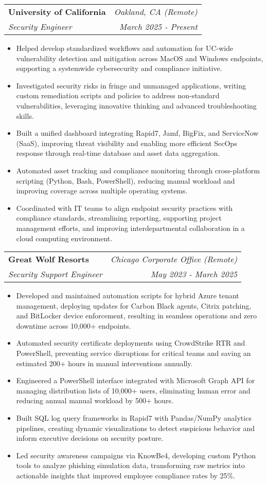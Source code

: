 \documentclass[letterpaper,10pt]{article}
\makeatletter
\newcommand{\resumeItem}[1]{
  \item\small{#1}
}
\newcommand{\resumeSubheading}[4]{
  \vspace{2pt}\item
    \begin{tabular*}{1.0\textwidth}[t]{l@{\extracolsep{\fill}}r}
      \textbf{#1} & \textit{#2} \\
      \textit{#3} & \textit{#4} \\
    \end{tabular*}\vspace{-4pt}
}
\newcommand{\resumeItemListStart}{\begin{itemize}[leftmargin=0.15in]}
\newcommand{\resumeItemListEnd}{\end{itemize}\vspace{-6pt}}
\makeatother
\begin{document}
    \resumeSubheading
      {University of California}{Oakland, CA (Remote)}
      {Security Engineer}{March 2025 - Present}
      \resumeItemListStart
        \resumeItem{Helped develop standardized workflows and automation for UC-wide vulnerability detection and mitigation across MacOS and Windows endpoints, supporting a systemwide cybersecurity and compliance initiative.}
        \resumeItem{Investigated security risks in fringe and unmanaged applications, writing custom remediation scripts and policies to address non-standard vulnerabilities, leveraging innovative thinking and advanced troubleshooting skills.}
        \resumeItem{Built a unified dashboard integrating Rapid7, Jamf, BigFix, and ServiceNow (SaaS), improving threat visibility and enabling more efficient SecOps response through real-time database and asset data aggregation.}
        \resumeItem{Automated asset tracking and compliance monitoring through cross-platform scripting (Python, Bash, PowerShell), reducing manual workload and improving coverage across multiple operating systems.}
        \resumeItem{Coordinated with IT teams to align endpoint security practices with compliance standards, streamlining reporting, supporting project management efforts, and improving interdepartmental collaboration in a cloud computing environment.}
      \resumeItemListEnd

    \resumeSubheading
      {Great Wolf Resorts}{Chicago Corporate Office (Remote)}
      {Security Support Engineer}{May 2023 - March 2025}
      \resumeItemListStart
        \resumeItem{Developed and maintained automation scripts for hybrid Azure tenant management, deploying updates for Carbon Black agents, Citrix patching, and BitLocker device enforcement, resulting in seamless operations and zero downtime across 10,000+ endpoints.}
        \resumeItem{Automated security certificate deployments using CrowdStrike RTR and PowerShell, preventing service disruptions for critical teams and saving an estimated 200+ hours in manual interventions annually.}
        \resumeItem{Engineered a PowerShell interface integrated with Microsoft Graph API for managing distribution lists of 10,000+ users, eliminating human error and reducing annual manual workload by 500+ hours.}
        \resumeItem{Built SQL log query frameworks in Rapid7 with Pandas/NumPy analytics pipelines, creating dynamic visualizations to detect suspicious behavior and inform executive decisions on security posture.}
        \resumeItem{Led security awareness campaigns via KnowBe4, developing custom Python tools to analyze phishing simulation data, transforming raw metrics into actionable insights that improved employee compliance rates by 25\%.}
      \resumeItemListEnd
\end{document}
